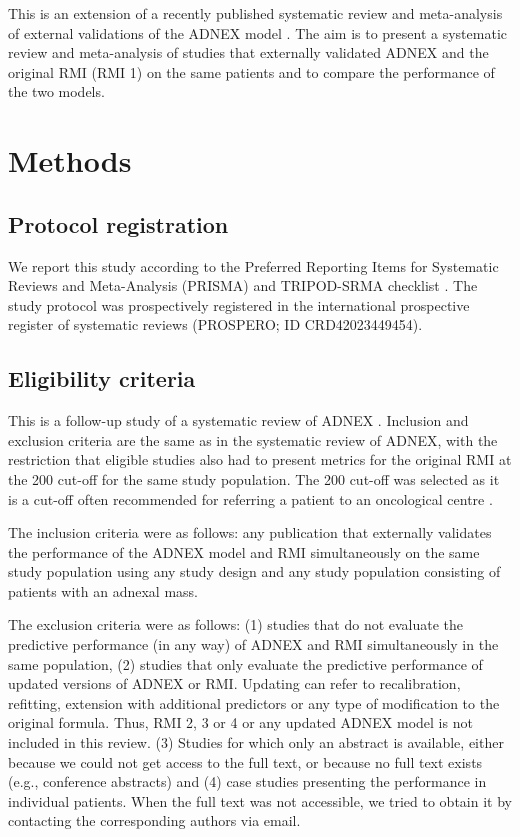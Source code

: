 This is an extension of a recently published systematic review and meta-analysis of
external validations of the \gls{ADNEX} model \cite{barrenadaADNEXRiskPrediction2024}. The
aim is to present a systematic review and meta-analysis of studies that externally
validated \gls{ADNEX} and the original \gls{RMI} (\gls{RMI} 1) on the same patients and to compare
the performance of the two models.

\section{Methods}

\subsection{Protocol registration}
We report this study according to the Preferred Reporting Items for Systematic
Reviews and Meta-Analysis (\gls{PRISMA}) and \gls{TRIPOD}-SRMA checklist
 \cite{pagePRISMA2020Statement2021,snellTransparentReportingMultivariable2023}.
The study protocol was prospectively registered in the international prospective
register of systematic reviews (\gls{PROSPERO}; ID CRD42023449454).

\subsection{Eligibility criteria}
This is a follow-up study of a systematic review of \gls{ADNEX}
 \cite{barrenadaADNEXRiskPrediction2024}. Inclusion and exclusion criteria are the
same as in the systematic review of \gls{ADNEX}, with the restriction that eligible studies
also had to present metrics for the original \gls{RMI} at the 200 cut-off for the same
study population. The 200 cut-off was selected as it is a cut-off often recommended
for referring a patient to an oncological centre
 \cite{OvarianMassesPremenopausal2016a,AggstockscancerMedEpitelial2023,staer-jensenBenigneCysterOvarienea,HandteringAfOvariecyster2016,OvarianCystsPostmenopausal2016}.

The inclusion criteria were as follows: any publication that externally validates the
performance of the \gls{ADNEX} model and \gls{RMI} simultaneously on the same study population
using any study design and any study population consisting of patients with an
adnexal mass.

The exclusion criteria were as follows: (1) studies that do not evaluate the
predictive performance (in any way) of \gls{ADNEX} and \gls{RMI} simultaneously in the same
population, (2) studies that only evaluate the predictive performance of updated
versions of \gls{ADNEX} or \gls{RMI}. Updating can refer to recalibration, refitting, extension
with additional predictors or any type of modification to the original formula. Thus,
\gls{RMI} 2, 3 or 4 or any updated \gls{ADNEX} model is not included in this review. (3)
Studies for which only an abstract is available, either because we could not get
access to the full text, or because no full text exists (e.g., conference abstracts)
and (4) case studies presenting the performance in individual patients. When the full
text was not accessible, we tried to obtain it by contacting the corresponding
authors via email.

